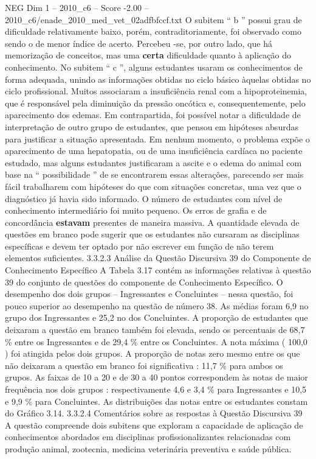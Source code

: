 \begin{textsample}{NEG Dim 1 – 2010\_c6 – Score -2.00 – 2010\_c6/enade\_2010\_med\_vet\_02adfbfccf.txt}
O subitem “ b ” possui grau de dificuldade relativamente baixo, porém, contraditoriamente, foi observado como sendo o de menor índice de acerto.
Percebeu -se, por outro lado, que há memorização de conceitos, mas uma \textbf{certa} dificuldade quanto à aplicação do conhecimento.
No subitem “ c ”, alguns estudantes usaram os conhecimentos de forma adequada, unindo as informações obtidas no ciclo básico àquelas obtidas no ciclo profissional.
Muitos associaram a insuficiência renal com a hipoproteinemia, que é responsável pela diminuição da pressão oncótica e, consequentemente, pelo aparecimento dos edemas.
Em contrapartida, foi possível notar a dificuldade de interpretação de outro grupo de estudantes, que pensou em hipóteses absurdas para justificar a situação apresentada.
Em nenhum momento, o problema expõe o aparecimento de uma hepatopatia, ou de uma insuficiência cardíaca no paciente estudado, mas alguns estudantes justificaram a ascite e o edema do animal com base na “ possibilidade ” de se encontrarem essas alterações, parecendo ser mais fácil trabalharem com hipóteses do que com situações concretas, uma vez que o diagnóstico já havia sido informado.
O número de estudantes com nível de conhecimento intermediário foi muito pequeno.
Os erros de grafia e de concordância \textbf{estavam} presentes de maneira massiva.
A quantidade elevada de questões em branco pode sugerir que os estudantes não cursaram as disciplinas específicas e devem ter optado por não escrever em função de não terem elementos suficientes. 3.3.2.3 Análise da Questão Discursiva 39 do Componente de Conhecimento Específico A Tabela 3.17 contém as informações relativas à questão 39 do conjunto de questões do componente de Conhecimento Específico.
O desempenho dos dois grupos – Ingressantes e Concluintes – nessa questão, foi pouco superior ao desempenho na questão de número 38.
As médias foram 6,9 no grupo dos Ingressantes e 25,2 no dos Concluintes.
A proporção de estudantes que deixaram a questão em branco também foi elevada, sendo os percentuais de 68,7 \% entre os Ingressantes e de 29,4 \% entre os Concluintes.
A nota máxima ( 100,0 ) foi atingida pelos dois grupos.
A proporção de notas zero mesmo entre os que não deixaram a questão em branco foi significativa : 11,7 \% para ambos os grupos.
As faixas de 10 a 20 e de 30 a 40 pontos correspondem às notas de maior frequência nos dois grupos : respectivamente 4,6 e 3,4 \% para Ingressantes e 10,5 e 9,9 \% para Concluintes.
As distribuições das notas entre os estudantes constam do Gráfico 3.14. 3.3.2.4 Comentários sobre as respostas à Questão Discursiva 39 A questão compreende dois subitens que exploram a capacidade de aplicação de conhecimentos abordados em disciplinas profissionalizantes relacionadas com produção animal, zootecnia, medicina veterinária preventiva e saúde pública.

\end{textsample}
